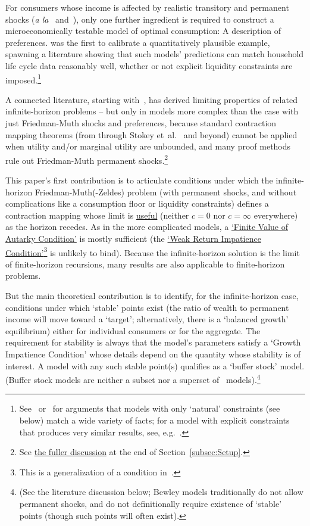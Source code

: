 \documentclass[BufferStockTheory]{subfiles}
\begin{document}
For consumers whose income is affected by realistic transitory and permanent shocks (\textit{a la}~\cite{friedmanATheory} and~\cite{muthOptimal}), only one further ingredient is required to construct a microeconomically testable model of optimal consumption: A description of preferences.  \cite{zeldesStochastic} was the first to calibrate a quantitatively plausible example, spawning a literature showing that such models' predictions can match household life cycle data reasonably well, whether or not explicit liquidity constraints are imposed.\footnote{See~\cite{carrollBSLCPIH} or~\cite{gpLifeCycle} for arguments that models with only `natural' constraints (see below) match a wide variety of facts; for a model with explicit constraints that produces very similar results, see, e.g.~\cite{Cagetti}.}

A connected literature, starting with~\cite{bewleyPIH}, has derived limiting properties of related infinite-horizon problems -- but only in models more complex than the case with just Friedman-Muth shocks and preferences, because standard contraction mapping theorems (from \cite{bellmanDynamicProgramming} through Stokey et~al.~\citeyearpar{slpMethods} and beyond) cannot be applied when utility and/or marginal utility are unbounded, and many proof methods rule out Friedman-Muth permanent shocks.\footnote{See \hyperlink{DiffFromLit}{the fuller discussion} at the end of Section~\ref{subsec:Setup}.}

This paper's first contribution is to articulate conditions under which the infinite-horizon Friedman-Muth(-Zeldes) problem (with permanent shocks, and without complications like a consumption floor or liquidity constraints) defines a contraction mapping whose limit is \hyperlink{useful}{useful} (neither $c=0$ nor $c=\infty$ everywhere) as the horizon recedes.  As in the more complicated models, a \hyperlink{FVAC}{`Finite Value of Autarky Condition'} is mostly sufficient (the \hyperlink{WRIC}{`Weak Return Impatience Condition'}\footnote{This is a generalization of a condition in~\cite{mstIncFluct}.} is unlikely to bind).  Because the infinite-horizon solution is the limit of finite-horizon recursions, many results are also applicable to finite-horizon problems.

But the main theoretical contribution is to identify, for the infinite-horizon case, conditions under which `stable' points exist (the ratio of wealth to permanent income will move toward a `target'; alternatively, there is a `balanced growth' equilibrium) either for individual consumers or for the aggregate.  The requirement for stability is always that the model's parameters satisfy a `Growth Impatience Condition' whose details depend on the quantity whose stability is of interest.  A model with any such stable point(s) qualifies as a `buffer stock' model.  (Buffer stock models are neither a subset nor a superset of~\cite{bewleyPIH} models).\footnote{(See the literature discussion below; Bewley models traditionally do not allow permanent shocks, and do not definitionally require existence of `stable' points (though such points will often exist).}
\end{document}
